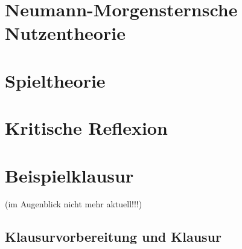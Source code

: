 \documentclass[12pt, a4paper, german]{book}
\numberwithin {equation}{section}
\begin{document}

\newpage


\newpage

\newpage




\chapter{Neumann-Morgensternsche Nutzentheorie} 


\newpage


\newpage

\newpage

 

\chapter{Spieltheorie}


\newpage


\newpage

\newpage



\chapter{Kritische Reflexion}



\chapter{Beispielklausur}
(im Augenblick nicht mehr aktuell!!!) 

\section{Klausurvorbereitung und Klausur}

\newpage

\newpage

  


\end{document}
